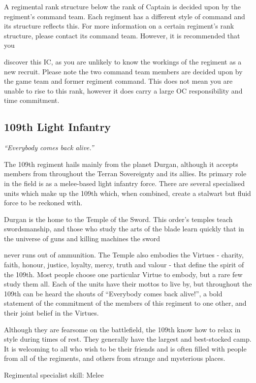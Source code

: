 A regimental rank structure below the rank of Captain is decided upon by the regiment's command team. Each regiment has a different style of command and its structure reflects this. For more information on a certain regiment's rank structure, please contact its command team. However, it is recommended that you

discover this IC, as you are unlikely to know the workings of the regiment as a new recruit. Please note the two command team members are decided upon by the game team and former regiment command. This does not mean you are unable to rise to this rank, however it does carry a large OC responsibility and time commitment.

\subsection{109th Light Infantry}

\textit{``Everybody comes back alive.''}

The 109th regiment hails mainly from the planet Durgan, although it accepts members from throughout the Terran Sovereignty and its allies. Its primary role in the field is as a melee-based light infantry force. There are several specialised units which make up the 109th which, when combined, create a stalwart but fluid force to be reckoned with.

Durgan is the home to the Temple of the Sword. This order's temples teach swordsmanship, and those who study the arts of the blade learn quickly that in the universe of guns and killing machines the sword

never runs out of ammunition. The Temple also embodies the Virtues - charity, faith, honour, justice, loyalty, mercy, truth and valour - that define the spirit of the 109th. Most people choose one particular Virtue to embody, but a rare few study them all. Each of the units have their mottos to live by, but throughout the 109th can be heard the shouts of ``Everybody comes back alive!'', a bold statement of the commitment of the members of this regiment to one other, and their joint belief in the Virtues.

Although they are fearsome on the battlefield, the 109th know how to relax in style during times of rest. They generally have the largest and best-stocked camp. It is welcoming to all who wish to be their friends and is often filled with people from all of the regiments, and others from strange and mysterious places.

Regimental specialist skill: Melee

